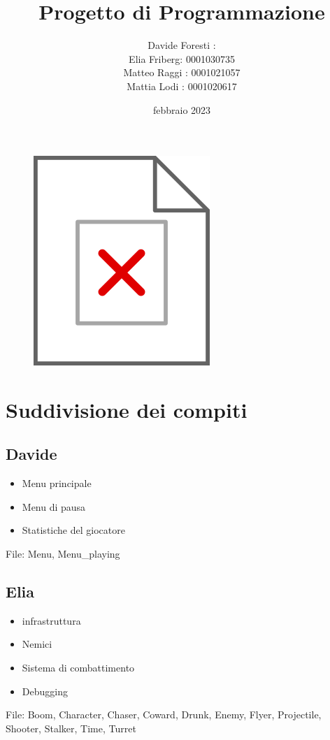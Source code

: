 \documentclass[12pt]{article}
\title{Progetto di Programmazione}
\author{Davide Foresti : \\
        Elia Friberg: 0001030735\\
        Matteo Raggi : 0001021057\\
        Mattia Lodi : 0001020617}
\date{febbraio 2023}
\begin{document}
\maketitle

\begin{figure}[h]
    \centering
    \includegraphics{800px-Seal_of_the_University_of_Bologna.svg.png}
\end{figure}

\newpage


\section*{Suddivisione dei compiti}
\subsection*{Davide}
\begin{itemize}
    \item Menu principale
    \item Menu di pausa
    \item Statistiche del giocatore
\end{itemize}
File: Menu, Menu\_playing
 
\subsection*{Elia}
\begin{itemize}
    \item infrastruttura
    \item Nemici 
    \item Sistema di combattimento
    \item Debugging
\end{itemize}
File: Boom, Character, Chaser, Coward, Drunk, Enemy, Flyer, Projectile, Shooter, Stalker, Time, Turret
\end{document}
